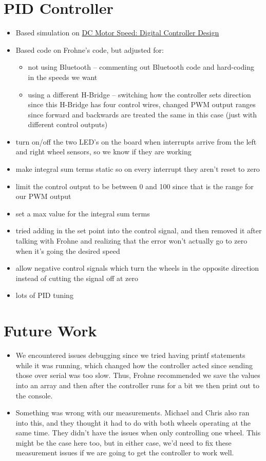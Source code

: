 \documentclass{article}
\begin{document}
\section{PID Controller}
\begin{itemize}
\item Based simulation on \href{http://ctms.engin.umich.edu/CTMS/index.php?example=MotorSpeed&section=ControlDigital}{DC Motor Speed: Digital Controller Design}
\item Based code on Frohne's code, but adjusted for:
	\begin{itemize}
	\item not using Bluetooth -- commenting out Bluetooth code and hard-coding in the speeds we want
	\item using a different H-Bridge -- switching how the controller sets direction since this H-Bridge has four control wires, changed PWM output ranges since forward and backwards are treated the same in this case (just with different control outputs)
	\end{itemize}
\item turn on/off the two LED's on the board when interrupts arrive from the left and right wheel sensors, so we know if they are working
\item make integral sum terms static so on every interrupt they aren't reset to zero
\item limit the control output to be between 0 and 100 since that is the range for our PWM output
\item set a max value for the integral sum terms
\item tried adding in the set point into the control signal, and then removed it after talking with Frohne and realizing that the error won't actually go to zero when it's going the desired speed
\item allow negative control signals which turn the wheels in the opposite direction instead of cutting the signal off at zero
\item lots of PID tuning
\end{itemize}

\section{Future Work}
\begin{itemize}
\item We encountered issues debugging since we tried having printf statements while it was running, which changed how the controller acted since sending those over serial was too slow. Thus, Frohne recommended we save the values into an array and then after the controller runs for a bit we then print out to the console.
\item Something was wrong with our measurements. Michael and Chris also ran into this, and they thought it had to do with both wheels operating at the same time. They didn't have the issues when only controlling one wheel. This might be the case here too, but in either case, we'd need to fix these measurement issues if we are going to get the controller to work well.
\end{itemize}
\end{document}
